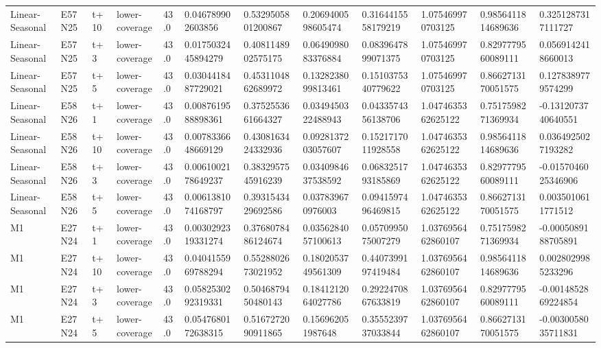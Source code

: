 \begin{landscape}
\begin{longtable}{llllllllllll}
Linear-Seasonal & E57N25 & t+10 & lower-coverage & 43.0 & 0.046789902603856 & 0.5329505801200867 & 0.2069400598605474 & 0.3164415558179219 & 1.075469970703125 & 0.9856411814689636 & 0.3251287317111727 \\
Linear-Seasonal & E57N25 & t+3 & lower-coverage & 43.0 & 0.0175032445894279 & 0.4081148902575175 & 0.0649098083376884 & 0.0839647899071375 & 1.075469970703125 & 0.8297779560089111 & 0.0569142418660013 \\
Linear-Seasonal & E57N25 & t+5 & lower-coverage & 43.0 & 0.0304418487729021 & 0.4531104862689972 & 0.1328238099813461 & 0.1510375340779622 & 1.075469970703125 & 0.8662713170051575 & 0.1278389779574299 \\
Linear-Seasonal & E58N26 & t+1 & lower-coverage & 43.0 & 0.0087619588898361 & 0.3752553661664327 & 0.0349450322488943 & 0.0433574356138706 & 1.0474635362625122 & 0.7517598271369934 & -0.1312073740640551 \\
Linear-Seasonal & E58N26 & t+10 & lower-coverage & 43.0 & 0.0078336648669129 & 0.4308163424332936 & 0.0928137203057607 & 0.1521717011928558 & 1.0474635362625122 & 0.9856411814689636 & 0.0364925027193282 \\
Linear-Seasonal & E58N26 & t+3 & lower-coverage & 43.0 & 0.0061002178649237 & 0.3832957545916239 & 0.0340984637538592 & 0.0683251793185869 & 1.0474635362625122 & 0.8297779560089111 & -0.0157046025346906 \\
Linear-Seasonal & E58N26 & t+5 & lower-coverage & 43.0 & 0.0061381074168797 & 0.3931543429692586 & 0.037839670976003 & 0.0941597496469815 & 1.0474635362625122 & 0.8662713170051575 & 0.0035010611771512 \\
M1 & E27N24 & t+1 & lower-coverage & 43.0 & 0.0030292319331274 & 0.3768078486124674 & 0.0356284057100613 & 0.0570995075007279 & 1.0376956462860107 & 0.7517598271369934 & -0.0005089188705891 \\
M1 & E27N24 & t+10 & lower-coverage & 43.0 & 0.0404155969788294 & 0.5528802673021952 & 0.1802053749561309 & 0.4407399197419484 & 1.0376956462860107 & 0.9856411814689636 & 0.0028029985233296 \\
M1 & E27N24 & t+3 & lower-coverage & 43.0 & 0.0582530292319331 & 0.5046879450480143 & 0.1841212064027786 & 0.2922470867633819 & 1.0376956462860107 & 0.8297779560089111 & -0.0014852869224854 \\
M1 & E27N24 & t+5 & lower-coverage & 43.0 & 0.0547680172638315 & 0.5167272090911865 & 0.156962051987648 & 0.3555239737033844 & 1.0376956462860107 & 0.8662713170051575 & -0.0030058035711831 \\

\end{longtable}
\end{landscape}
